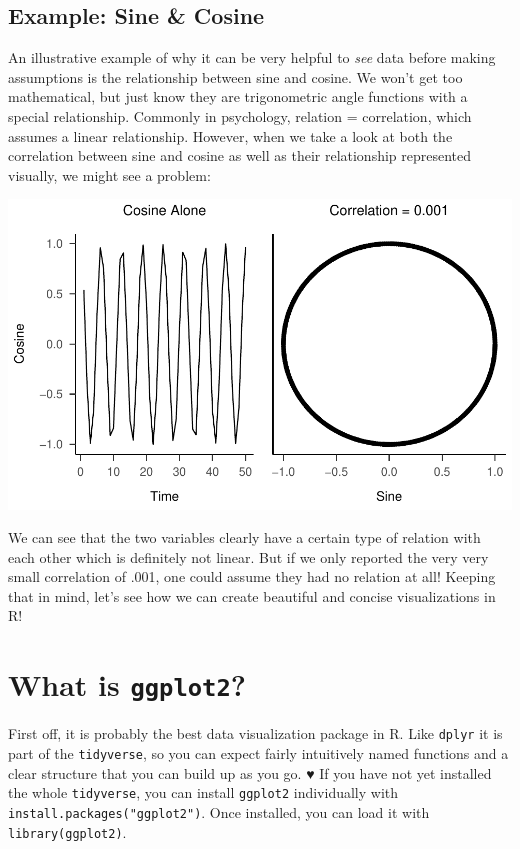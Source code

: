 \documentclass[
]{book}
\begin{document}
\subsection{Example: Sine \& Cosine}\label{example-sine-cosine}

An illustrative example of why it can be very helpful to \emph{see} data before making assumptions is the relationship between sine and cosine.
We won't get too mathematical, but just know they are trigonometric angle functions with a special relationship.
Commonly in psychology, relation = correlation, which assumes a linear relationship.
However, when we take a look at both the correlation between sine and cosine as well as their relationship represented visually, we might see a problem:

\includegraphics{_main_files/figure-html/unnamed-chunk-34-1.pdf}

We can see that the two variables clearly have a certain type of relation with each other which is definitely not linear.
But if we only reported the very very small correlation of .001, one could assume they had no relation at all!
Keeping that in mind, let's see how we can create beautiful and concise visualizations in R!

\section{\texorpdfstring{What is \texttt{ggplot2}?}{What is ggplot2?}}\label{what-is-ggplot2}

First off, it is probably the best data visualization package in R.
Like \texttt{dplyr} it is part of the \texttt{tidyverse}, so you can expect fairly intuitively named functions and a clear structure that you can build up as you go. ♥
If you have not yet installed the whole \texttt{tidyverse}, you can install \texttt{ggplot2} individually with \texttt{install.packages("ggplot2")}.
Once installed, you can load it with \texttt{library(ggplot2)}.
\end{document}
